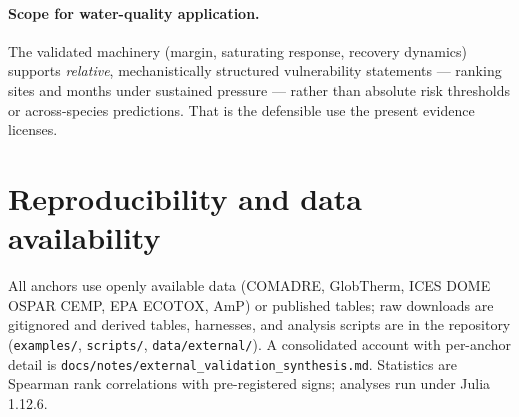 \paragraph{Scope for water-quality application.} The validated machinery (margin, saturating response,
recovery dynamics) supports \emph{relative}, mechanistically structured vulnerability statements ---
ranking sites and months under sustained pressure --- rather than absolute risk thresholds or
across-species predictions. That is the defensible use the present evidence licenses.

\section*{Reproducibility and data availability}
All anchors use openly available data (COMADRE, GlobTherm, ICES DOME OSPAR CEMP, EPA ECOTOX, AmP) or
published tables; raw downloads are gitignored and derived tables, harnesses, and analysis scripts are
in the repository (\texttt{examples/}, \texttt{scripts/}, \texttt{data/external/}). A consolidated
account with per-anchor detail is \texttt{docs/notes/external\_validation\_synthesis.md}. Statistics are
Spearman rank correlations with pre-registered signs; analyses run under Julia 1.12.6.





